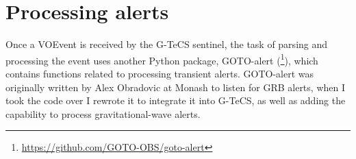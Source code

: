 
\section{Processing alerts}
\label{sec:gotoalert}


\begin{colsection}

Once a VOEvent is received by the G-TeCS sentinel, the task of parsing and processing the event uses another Python package, GOTO-alert (\footnote{\url{https://github.com/GOTO-OBS/goto-alert}}), which contains functions related to processing transient alerts. GOTO-alert was originally written by Alex Obradovic at Monash to listen for GRB alerts, when I took the code over I rewrote it to integrate it into G-TeCS, as well as adding the capability to process gravitational-wave alerts.

\end{colsection}


